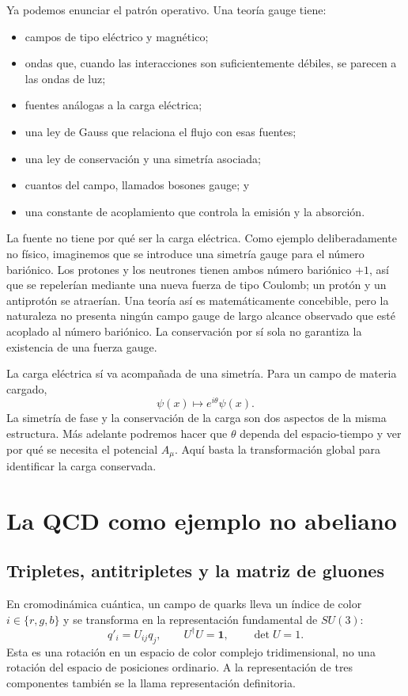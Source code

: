 Ya podemos enunciar el patrón operativo. Una teoría gauge tiene:
\begin{itemize}
\item campos de tipo eléctrico y magnético;
\item ondas que, cuando las interacciones son suficientemente débiles, se parecen a las ondas de luz;
\item fuentes análogas a la carga eléctrica;
\item una ley de Gauss que relaciona el flujo con esas fuentes;
\item una ley de conservación y una simetría asociada;
\item cuantos del campo, llamados bosones gauge; y
\item una constante de acoplamiento que controla la emisión y la absorción.
\end{itemize}
La fuente no tiene por qué ser la carga eléctrica. Como ejemplo deliberadamente no físico, imaginemos que se introduce una simetría gauge para el número bariónico. Los protones y los neutrones tienen ambos número bariónico \(+1\), así que se repelerían mediante una nueva fuerza de tipo Coulomb; un protón y un antiprotón se atraerían. Una teoría así es matemáticamente concebible, pero la naturaleza no presenta ningún campo gauge de largo alcance observado que esté acoplado al número bariónico. La conservación por sí sola no garantiza la existencia de una fuerza gauge.

La carga eléctrica sí va acompañada de una simetría. Para un campo de materia cargado,
\begin{equation}
\psi(x)\longmapsto e^{i\theta}\psi(x).
\label{eq:l5-u1}
\end{equation}
La simetría de fase y la conservación de la carga son dos aspectos de la misma estructura. Más adelante podremos hacer que \(\theta\) dependa del espacio-tiempo y ver por qué se necesita el potencial \(A_\mu\). Aquí basta la transformación global para identificar la carga conservada.

\section{La QCD como ejemplo no abeliano}

\subsection{Tripletes, antitripletes y la matriz de gluones}

En cromodinámica cuántica, un campo de quarks lleva un índice de color \(i\in\{r,g,b\}\) y se transforma en la representación fundamental de \(SU(3)\):
\begin{equation}
q'_i=U_{ij}q_j,
\qquad
U^\dagger U=\boldsymbol 1,
\qquad
\det U=1.
\label{eq:l5-q-transform}
\end{equation}
Esta es una rotación en un espacio de color complejo tridimensional, no una rotación del espacio de posiciones ordinario. A la representación de tres componentes también se la llama representación definitoria.


